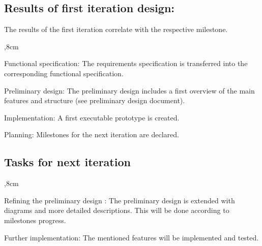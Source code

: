 \subsection{Results of first iteration design:}
The results of the first iteration correlate with the respective milestone. 
\begin{aims}
	,8cm
		\item[Functional specification:] The requirements specification is transferred into the corresponding functional specification.
		
	    \item[Preliminary design:] The preliminary design includes a first overview of the main features and structure (see preliminary design document).
		\item[Implementation:] A first executable prototype is created.
		
		\item[Planning:] Milestones for the next iteration are declared.
				
	\end{aims}

\subsection{Tasks for next iteration}

\begin{aims}
	,8cm
	\item[Refining the preliminary design :] The preliminary design is extended with diagrams and more detailed descriptions. This will be done according to milestones progress.
		
		\item[Further implementation:] The mentioned features will be implemented and tested.
	
\end{aims}